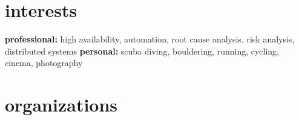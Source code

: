 \documentclass[]{friggeri-cv} %
\begin{document}





\section{interests}

\textbf{professional:} high availability, automation, root cause analysis, risk analysis, distributed systems \textbf{personal:} scuba diving, bouldering, running, cycling, cinema, photography


\section{organizations}
\end{document}
